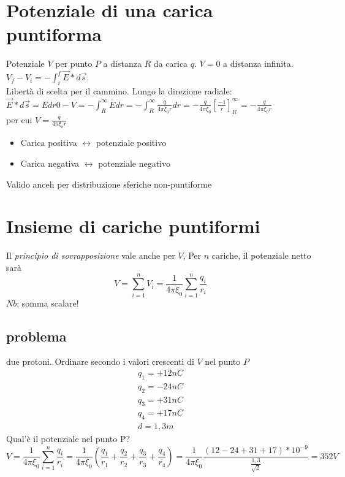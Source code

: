 \documentclass{book}
\begin{document}
\section{Potenziale di una carica puntiforma}
Potenziale $V$ per punto $P$ a distanza $R$ da carica $q$. $V=0$ a distanza infinita. $V_f-V_i=-\int^f_i\vec{E}*d\vec{s}$.\\
Libertà di scelta per il cammino. Lungo la direzione radiale: $\vec{E}*d\vec{s}=Edr0-V=-\int^\infty_REdr=-\int^\infty_R\frac{q}{4\pi \xi_0r}dr=-\frac{q}{4\pi \xi_0}\left[\frac{-1}{r}\right]^\infty_R=-\frac{q}{4\pi \xi_0 r}$\\
per cui $V=\frac{q}{4\pi\xi_or}$
\begin{itemize}
\item Carica positiva $\leftrightarrow$ potenziale positivo
\item Carica negativa $\leftrightarrow$ potenziale negativo
\end{itemize}
Valido anceh per distribuzione sferiche non-puntiforme
\section{Insieme di cariche puntiformi}
Il \textit{principio di sovrapposizione} vale anche per $V$, Per $n$ cariche, il potenziale netto sarà
\begin{equation}
  V=\sum_{i=1}^{n}V_i=\frac{1}{4\pi \xi_0}\sum_{i=1}^{n}\frac{q_i}{r_i}
\end{equation}
$Nb$: somma scalare!
\subsection{problema}
due protoni. Ordinare secondo i valori crescenti di $V$ nel punto $P$
\begin{equation}
  \begin{matrix}
    q_1=+12nC\\
    q_2=-24nC\\
    q_3=+31nC\\
    q_4=+17nC\\
    d=1,3m
  \end{matrix}
\end{equation}
Qual'è il potenziale nel punto P?
\begin{equation}
  V=\frac{1}{4\pi \xi_0}\sum_{i=1}^{n}\frac{q_i}{r_i}=
  \frac{1}{4\pi\xi_0}\left(\frac{q_1}{r_1}+\frac{q_2}{r_2}+\frac{q_3}{r_3}
    +\frac{q_4}{r_4}\right)=\frac{1}{4\pi\xi_0}
  \frac{(12-24+31+17)*10^{-9}}{\frac{1,3}{\sqrt{2}}}=352V
\end{equation}
\end{document}
